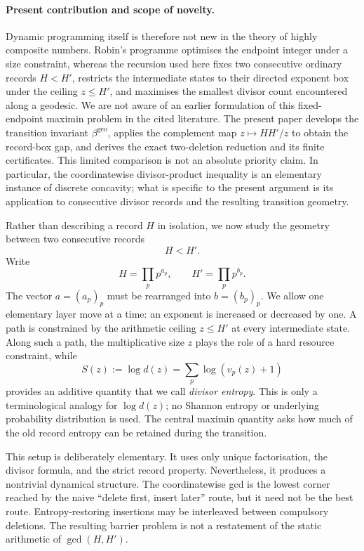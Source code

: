 \documentclass[11pt]{article}
\numberwithin{equation}{section}
\theoremstyle{blueplain}
\theoremstyle{bluedef}
\newcommand{\vpp}[2]{v_{#1}(#2)}
\newcommand{\betageo}{\beta^{\mathrm{geo}}}
\begin{document}
\paragraph{Present contribution and scope of novelty.}
Dynamic programming itself is therefore not new in the theory of highly composite numbers.  Robin's programme optimises the endpoint integer under a size constraint, whereas the recursion used here fixes two consecutive ordinary records $H<H'$, restricts the intermediate states to their directed exponent box under the ceiling $z\le H'$, and maximises the smallest divisor count encountered along a geodesic.  We are not aware of an earlier formulation of this fixed-endpoint maximin problem in the cited literature.  The present paper develops the transition invariant $\betageo$, applies the complement map $z\mapsto HH'/z$ to obtain the record-box gap, and derives the exact two-deletion reduction and its finite certificates.  This limited comparison is not an absolute priority claim.  In particular, the coordinatewise divisor-product inequality is an elementary instance of discrete concavity; what is specific to the present argument is its application to consecutive divisor records and the resulting transition geometry.

Rather than describing a record $H$ in isolation, we now study the geometry between two consecutive records
\[
 H<H'.
\]
Write
\begin{equation}
 H=\prod_p p^{a_p},
 \qquad
 H'=\prod_p p^{b_p}.
 \label{eq:endpoint-vectors-intro}
\end{equation}
The vector $a=(a_p)_p$ must be rearranged into $b=(b_p)_p$.  We allow one elementary layer move at a time: an exponent is increased or decreased by one.  A path is constrained by the arithmetic ceiling $z\le H'$ at every intermediate state.  Along such a path, the multiplicative size $z$ plays the role of a hard resource constraint, while
\begin{equation}
 S(z):=\log d(z)=\sum_p\log(\vpp pz+1)
 \label{eq:divisor-entropy-intro}
\end{equation}
provides an additive quantity that we call \emph{divisor entropy}.  This is only a terminological analogy for $\log d(z)$; no Shannon entropy or underlying probability distribution is used.  The central maximin quantity asks how much of the old record entropy can be retained during the transition.

This setup is deliberately elementary.  It uses only unique factorisation, the divisor formula, and the strict record property.  Nevertheless, it produces a nontrivial dynamical structure.  The coordinatewise gcd is the lowest corner reached by the naive ``delete first, insert later'' route, but it need not be the best route.  Entropy-restoring insertions may be interleaved between compulsory deletions.  The resulting barrier problem is not a restatement of the static arithmetic of $\gcd(H,H')$.
\end{document}
